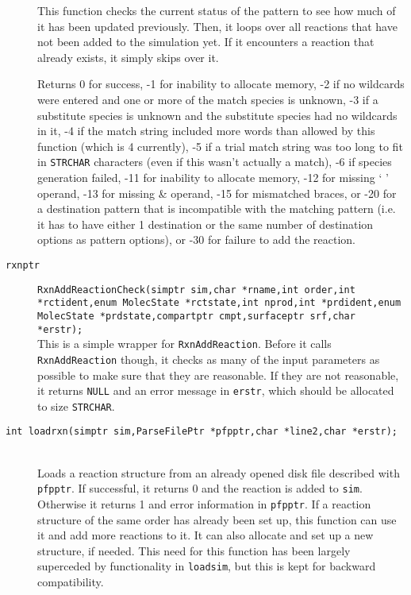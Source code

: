 \documentclass {book}
\begin{document}
\begin{description}
This function checks the current status of the pattern to see how much of it has been updated previously.  Then, it loops over all reactions that have not been added to the simulation yet.  If it encounters a reaction that already exists, it simply skips over it.

Returns 0 for success, -1 for inability to allocate memory, -2 if no wildcards were entered and one or more of the match species is unknown, -3 if a substitute species is unknown and the substitute species had no wildcards in it, -4 if the match string included more words than allowed by this function (which is 4 currently), -5 if a trial match string was too long to fit in \texttt{STRCHAR} characters (even if this wasn't actually a match), -6 if species generation failed, -11 for inability to allocate memory, -12 for missing ` ' operand, -13 for missing \& operand, -15 for mismatched braces, or -20 for a destination pattern that is incompatible with the matching pattern (i.e. it has to have either 1 destination or the same number of destination options as pattern options), or -30 for failure to add the reaction.

\item[\texttt{rxnptr}]
\texttt{RxnAddReactionCheck(simptr sim,char *rname,int order,int *rctident,enum MolecState *rctstate,int nprod,int *prdident,enum MolecState *prdstate,compartptr cmpt,surfaceptr srf,char *erstr);} \\
This is a simple wrapper for \texttt{RxnAddReaction}.  Before it calls \texttt{RxnAddReaction} though, it checks as many of the input parameters as possible to make sure that they are reasonable.  If they are not reasonable, it returns \texttt{NULL} and an error message in \texttt{erstr}, which should be allocated to size \texttt{STRCHAR}.

\item[\texttt{int loadrxn(simptr sim,ParseFilePtr *pfpptr,char *line2,char *erstr);}]
\hfill \\
Loads a reaction structure from an already opened disk file described with \texttt{pfpptr}.  If successful, it returns 0 and the reaction is added to \texttt{sim}.  Otherwise it returns 1 and error information in \texttt{pfpptr}.  If a reaction structure of the same order has already been set up, this function can use it and add more reactions to it.  It can also allocate and set up a new structure, if needed.  This need for this function has been largely superceded by functionality in \texttt{loadsim}, but this is kept for backward compatibility.


\end{description}
\end{document}
